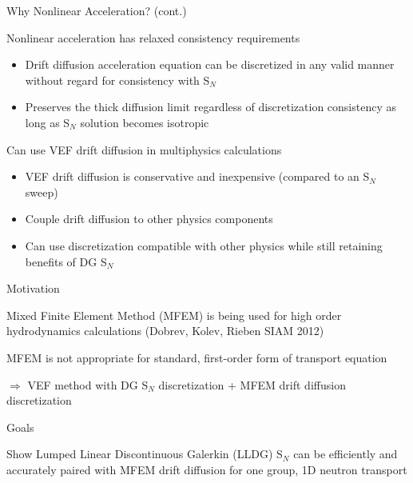 \documentclass[10pt]{beamer}
\newcommand{\SN}{S$_N$\xspace}
\begin{document}
\begin{frame}{Why Nonlinear Acceleration? (cont.)}


		Nonlinear acceleration has relaxed consistency requirements 
		\begin{itemize}
			\item Drift diffusion acceleration equation can be discretized in any valid manner without regard for consistency with \SN  

			\item Preserves the thick diffusion limit regardless of discretization consistency as long as \SN solution becomes isotropic 
		\end{itemize}

		Can use VEF drift diffusion in multiphysics calculations  
		\begin{itemize}

			\item VEF drift diffusion is conservative and inexpensive (compared to an \SN sweep) 

			\item Couple drift diffusion to other physics components 

			\item Can use discretization compatible with other physics while still retaining benefits of DG \SN 

		\end{itemize}


\end{frame}

\begin{frame}{Motivation}


		Mixed Finite Element Method (MFEM) is being used for high order hydrodynamics calculations (Dobrev, Kolev, Rieben SIAM 2012)

		MFEM is not appropriate for standard, first-order form of transport equation 

		$\Rightarrow$ VEF method with DG \SN discretization + MFEM drift diffusion discretization 


	\vfill
	\begin{alertblock}{Goals}
		
		Show Lumped Linear Discontinuous Galerkin (LLDG) \SN can be efficiently and accurately paired with MFEM drift diffusion for one group, 1D neutron transport 

	\end{alertblock}

\end{frame}
\end{document}
